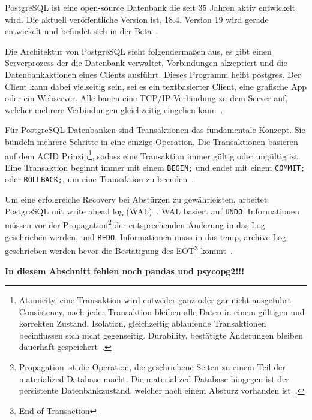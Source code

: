 
PostgreSQL ist eine open-source Datenbank die seit 35 Jahren aktiv entwickelt wird.
Die aktuell veröffentliche Version ist, 18.4.
Version 19 wird gerade entwickelt und befindet sich in der Beta~\cite{PostgreSQL}.

Die Architektur von PostgreSQL sieht folgendermaßen aus, es gibt einen Serverprozess der die Datenbank verwaltet,
Verbindungen akzeptiert und die Datenbankaktionen eines Clients ausführt.
Dieses Programm heißt postgres.
Der Client kann dabei vielseitig sein, sei es ein textbasierter Client, eine grafische App oder ein Webserver.
Alle bauen eine TCP/IP-Verbindung zu dem Server auf, welcher mehrere Verbindungen gleichzeitig eingehen kann~\cite{PostgreSQLArchitecture}.

Für PostgreSQL Datenbanken sind Transaktionen das fundamentale Konzept.
Sie bündeln mehrere Schritte in eine einzige Operation.
Die Transaktionen basieren auf dem ACID Prinzip\footnote{Atomicity, eine Transaktion wird entweder ganz oder gar nicht ausgeführt.
	Consistency, nach jeder Transaktion bleiben alle Daten in einem gültigen und korrekten Zustand.
	Isolation, gleichzeitig ablaufende Transaktionen beeinflussen sich nicht gegenseitig.
	Durability, bestätigte Änderungen bleiben dauerhaft gespeichert~\cite{Haerder1983}.}, sodass eine Transaktion immer
gültig oder ungültig ist.
Eine Transaktion beginnt immer mit einem \texttt{BEGIN;} und endet mit einem \texttt{COMMIT;} oder \texttt{ROLLBACK;},
um eine Transaktion zu beenden~\cite{PostgreSQLTransactions}.

Um eine erfolgreiche Recovery bei Abstürzen zu gewährleisten, arbeitet PostgreSQL mit write ahead log (WAL)~\cite{PostgreSQLWAL}.
WAL basiert auf \texttt{UNDO}, Informationen müssen vor der Propagation\footnote{Propagation ist die Operation,
	die geschriebene Seiten zu einem Teil der materialized Database macht. Die materialized Database hingegen ist der
	persistente Datenbankzustand, welcher nach einem Absturz vorhanden ist~\cite{Haerder1983}.}
der entsprechenden Änderung in das Log geschrieben werden, und \texttt{REDO}, Informationen muss in das temp, archive
Log geschrieben werden bevor die Bestätigung des EOT\footnote{End of Transaction} kommt~\cite{Haerder1983}.

\textbf{In diesem Abschnitt fehlen noch pandas und psycopg2!!!}
